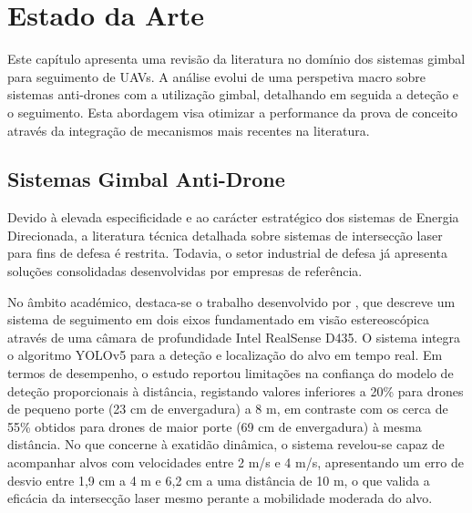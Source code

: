 
\chapter{Estado da Arte} %

\label{chap:Chapter2} %

Este capítulo apresenta uma revisão da literatura no domínio dos sistemas gimbal para seguimento de UAVs. A análise evolui de uma perspetiva macro sobre sistemas anti-drones com a utilização gimbal, detalhando em seguida a deteção e o seguimento. Esta abordagem visa otimizar a performance da prova de conceito através da integração de mecanismos mais recentes na literatura.


\section{Sistemas Gimbal Anti-Drone}

Devido à elevada especificidade e ao carácter estratégico dos sistemas de Energia Direcionada, a literatura técnica detalhada sobre sistemas de intersecção laser para fins de defesa é restrita. Todavia, o setor industrial de defesa já apresenta soluções consolidadas desenvolvidas por empresas de referência. 

No âmbito académico, destaca-se o trabalho desenvolvido por \cite{sistemalasergimbal}, que descreve um sistema de seguimento em dois eixos fundamentado em visão estereoscópica através de uma câmara de profundidade Intel RealSense D435. O sistema integra o algoritmo YOLOv5 para a deteção e localização do alvo em tempo real. Em termos de desempenho, o estudo reportou limitações na confiança do modelo de deteção proporcionais à distância, registando valores inferiores a 20\% para drones de pequeno porte (23 cm de envergadura) a 8 m, em contraste com os cerca de 55\% obtidos para drones de maior porte (69 cm de envergadura) à mesma distância. No que concerne à exatidão dinâmica, o sistema revelou-se capaz de acompanhar alvos com velocidades entre 2 m/s e 4 m/s, apresentando um erro de desvio entre 1,9 cm a 4 m e 6,2 cm a uma distância de 10 m, o que valida a eficácia da intersecção laser mesmo perante a mobilidade moderada do alvo.

